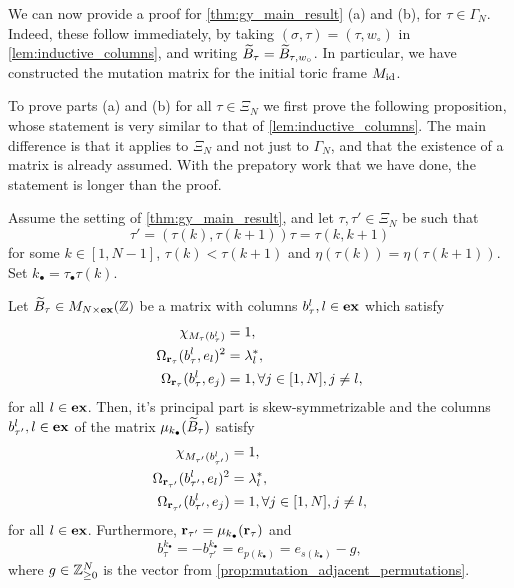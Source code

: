 We can now provide a proof for \cref{thm:gy_main_result} (a) and (b), for $\tau \in
	\Gamma_N$. Indeed, these follow immediately, by taking $(\sigma, \tau) = (\tau,
	w_\circ)$ in \cref{lem:inductive_columns}, and writing $\widetilde{B}_{\tau} = \widetilde{B}_{\tau,
		w_\circ}$. In particular, we have constructed the mutation matrix for the initial toric
frame $M_{\operatorname{id}}$.

To prove parts (a) and (b) for all $\tau \in \Xi_N$ we first prove the following
proposition, whose statement is very similar to that of \cref{lem:inductive_columns}.
The main difference is that it applies to $\Xi_N$ and not just to $\Gamma_N$, and that
the existence of a matrix is already assumed. With the prepatory work that we have
done, the statement is longer than the proof.
\begin{proposition}\label{prop:inductive_mutation}
	Assume the setting of \cref{thm:gy_main_result}, and let $\tau, \tau' \in \Xi_N$ be such that
	\begin{equation*}
		\tau' = (\tau(k), \tau(k+1))\tau = \tau(k, k+1)
	\end{equation*}
	for some $k \in [1, N-1]$, $\tau(k) < \tau(k + 1)$ and $\eta(\tau(k)) =
		\eta(\tau(k+1))$. Set $k_\bullet = \tau_\bullet\tau(k)$.

	Let $\widetilde{B}_{\tau} \in M_{N \times \mathbf{ex}}(\mathbb{Z})$ be a matrix with columns $b^l_\tau, l \in
		\mathbf{ex}$ which satisfy
	\begin{equation*}
		\begin{aligned}
			\chi_{M_\tau(b^l_{\tau})}             & = 1,                                \\
			\Omega_{\mathbf{r}_\tau}(b^l_{\tau}, e_l)^2 & = \lambda^*_l,                      \\
			\Omega_{\mathbf{r}_\tau}(b^l_{\tau}, e_j)   & = 1, \forall j \in [1, N], j\neq l,
		\end{aligned}
	\end{equation*}
	for all $l\in \mathbf{ex}$. Then, it's principal part is skew-symmetrizable and the columns
	$b^l_{\tau'}, l \in \mathbf{ex}$ of the matrix $\mu_{k_\bullet}(\widetilde{B}_\tau)$ satisfy
	\begin{equation*}
		\begin{aligned}
			\chi_{M_{\tau'}(b^l_{{\tau'}})}             & = 1,                                \\
			\Omega_{\mathbf{r}_{\tau'}}(b^l_{{\tau'}}, e_l)^2 & = \lambda^*_l,                      \\
			\Omega_{\mathbf{r}_{\tau'}}(b^l_{{\tau'}}, e_j)   & = 1, \forall j \in [1, N], j\neq l,
		\end{aligned}
	\end{equation*}
	for all $l \in \mathbf{ex}$. Furthermore, $\mathbf{r}_{\tau'} = \mu_{k_\bullet}(\mathbf{r}_\tau)$ and
	\begin{equation*}
		b^{k_\bullet}_\tau = - b^{k_\bullet}_{\tau'} = e_{p(k_\bullet)} = e_{s(k_\bullet)} - g,
	\end{equation*}
	where $g\in \mathbb{Z}_{\geq 0}^N$ is the vector from
	\cref{prop:mutation_adjacent_permutations}.
\end{proposition}

